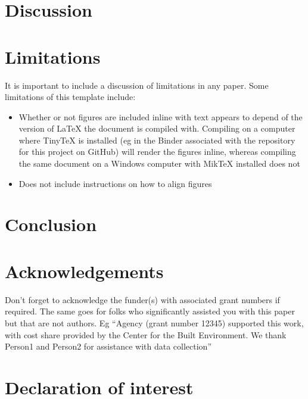 \documentclass[]{elsarticle} %
\providecommand{\tightlist}{%
  \setlength{\itemsep}{0pt}\setlength{\parskip}{0pt}}
\begin{document}
\hypertarget{discussion}{%
\section{Discussion}\label{discussion}}

\hypertarget{limitations}{%
\section{Limitations}\label{limitations}}

It is important to include a discussion of limitations in any paper. Some limitations of this template include:

\begin{itemize}
\tightlist
\item
  Whether or not figures are included inline with text appears to depend of the version of LaTeX the document is compiled with. Compiling on a computer where TinyTeX is installed (eg in the Binder associated with the repository for this project on GitHub) will render the figures inline, whereas compiling the same document on a Windows computer with MikTeX installed does not
\item
  Does not include instructions on how to align figures
\end{itemize}

\hypertarget{conclusion}{%
\section{Conclusion}\label{conclusion}}

\hypertarget{acknowledgements}{%
\section{Acknowledgements}\label{acknowledgements}}

Don't forget to acknowledge the funder(s) with associated grant numbers if required. The same goes for folks who significantly assisted you with this paper but that are not authors. Eg ``Agency (grant number 12345) supported this work, with cost share provided by the Center for the Built Environment. We thank Person1 and Person2 for assistance with data collection''

\hypertarget{declaration-of-interest}{%
\section{Declaration of interest}\label{declaration-of-interest}}
\end{document}

